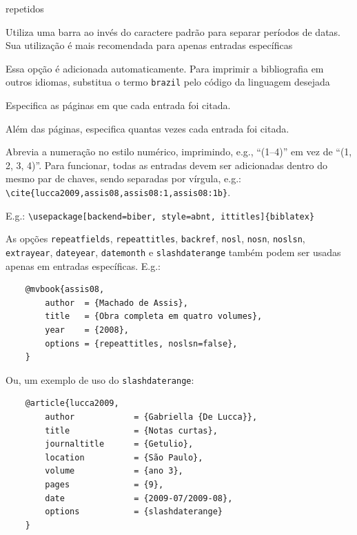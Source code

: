 \documentclass[a4paper]{article}
\begin{document}
\begin{description}[itemindent=-1em,leftmargin=3em]
    repetidos
  \item [slashdaterange] Utiliza uma barra ao invés do caractere padrão para separar períodos de datas. Sua utilização é mais recomendada para apenas entradas específicas
  \item [language=brazil] Essa opção é adicionada automaticamente. Para
    imprimir a bibliografia em outros idiomas, substitua o termo
    \texttt{brazil} pelo código da linguagem desejada
  \item [backref] Especifica as páginas em que cada entrada foi citada.
  \item [citecount] Além das páginas, especifica quantas vezes cada entrada
    foi citada.
  \item [comp] Abrevia a numeração no estilo numérico, imprimindo, e.g.,
    \enquote{(1--4)} em vez de \enquote{(1, 2, 3, 4)}. Para funcionar, todas as entradas devem ser adicionadas dentro do mesmo par de chaves, sendo separadas por vírgula, e.g.: \verb|\cite{lucca2009,assis08,assis08:1,assis08:1b}|.
\end{description}%

\vspace{\baselineskip}
E.g.: \verb"\usepackage[backend=biber, style=abnt, ittitles]{biblatex}"

\begin{sloppypar}
  As opções \texttt{repeatfields}, \texttt{repeattitles}, \texttt{backref},
  \texttt{nosl}, \texttt{nosn}, \texttt{noslsn}, \texttt{extrayear}, \texttt{dateyear}, \texttt{datemonth} e \texttt{slashdaterange} também
  podem ser usadas apenas em entradas específicas. E.g.:
\end{sloppypar}

\begin{verbatim}
    @mvbook{assis08,
        author  = {Machado de Assis},
        title   = {Obra completa em quatro volumes},
        year    = {2008},
        options = {repeattitles, noslsn=false},
    }
\end{verbatim}

Ou, um exemplo de uso do \texttt{slashdaterange}:
\begin{verbatim}
    @article{lucca2009,
        author            = {Gabriella {De Lucca}},
        title             = {Notas curtas},
        journaltitle      = {Getulio},
        location          = {São Paulo},
        volume            = {ano 3},
        pages             = {9},
        date              = {2009-07/2009-08},  
        options           = {slashdaterange}
    }
\end{verbatim}
\end{document}
